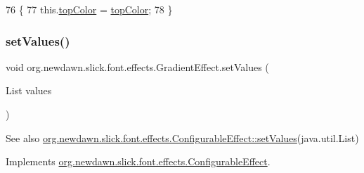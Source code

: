 \begin{DoxyCode}
76                                             \{
77         this.\mbox{\hyperlink{classorg_1_1newdawn_1_1slick_1_1font_1_1effects_1_1_gradient_effect_abd381669fcbe81fae9c0fb7546d8089d}{topColor}} = \mbox{\hyperlink{classorg_1_1newdawn_1_1slick_1_1font_1_1effects_1_1_gradient_effect_abd381669fcbe81fae9c0fb7546d8089d}{topColor}};
78     \}
\end{DoxyCode}
\mbox{\label{classorg_1_1newdawn_1_1slick_1_1font_1_1effects_1_1_gradient_effect_a0b5d8084ce260e1c4166078be76a8d6a}} 
\subsubsection{\texorpdfstring{set\+Values()}{setValues()}}
{\footnotesize\ttfamily void org.\+newdawn.\+slick.\+font.\+effects.\+Gradient\+Effect.\+set\+Values (\begin{DoxyParamCaption}\item[{List}]{values }\end{DoxyParamCaption})\hspace{0.3cm}{\ttfamily [inline]}}

\begin{DoxySeeAlso}{See also}
\mbox{\hyperlink{interfaceorg_1_1newdawn_1_1slick_1_1font_1_1effects_1_1_configurable_effect_ac5e1cb43cb0c6b61753616dc746903a2}{org.\+newdawn.\+slick.\+font.\+effects.\+Configurable\+Effect\+::set\+Values}}(java.\+util.\+List) 
\end{DoxySeeAlso}


Implements \mbox{\hyperlink{interfaceorg_1_1newdawn_1_1slick_1_1font_1_1effects_1_1_configurable_effect_ac5e1cb43cb0c6b61753616dc746903a2}{org.\+newdawn.\+slick.\+font.\+effects.\+Configurable\+Effect}}.


